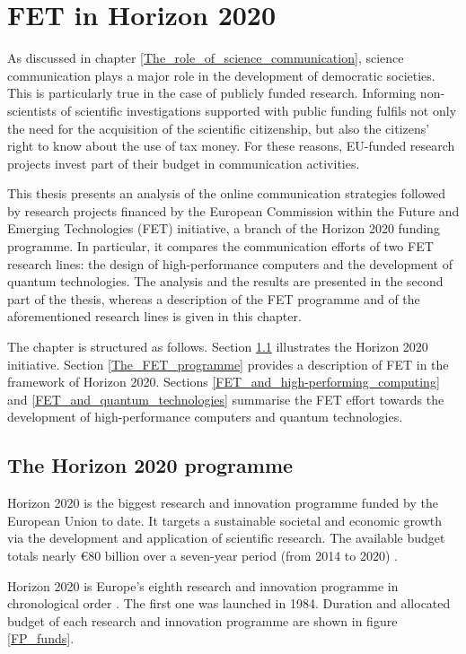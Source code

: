 \chapter{FET in Horizon 2020} \label{FET_in_Horizon_2020}
As discussed in chapter \ref{The_role_of_science_communication}, science communication plays a major role in the development of democratic societies. This is particularly true in the case of publicly funded research. Informing non-scientists of scientific investigations supported with public funding fulfils not only the need for the acquisition of the scientific citizenship, but also the citizens' right to know about the use of tax money. For these reasons, EU-funded research projects invest part of their budget in communication activities. 

This thesis presents an analysis of the online communication strategies followed by research projects financed by the European Commission within the Future and Emerging Technologies (FET) initiative, a branch of the Horizon 2020 funding programme. In particular, it compares the communication efforts of two FET research lines: the design of high-performance computers and the development of quantum technologies. The analysis and the results are presented in the second part of the thesis, whereas a description of the FET programme and of the aforementioned research lines is given in this chapter. 

The chapter is structured as follows. Section \ref{The_Horizon_2020_programme} illustrates the Horizon 2020 initiative. Section \ref{The_FET_programme} provides a description of FET in the framework of Horizon 2020. Sections \ref{FET_and_high-performing_computing} and \ref{FET_and_quantum_technologies} summarise the FET effort towards the development of high-performance computers and quantum technologies.

\section{The Horizon 2020 programme} \label{The_Horizon_2020_programme}
Horizon 2020 is the biggest research and innovation programme funded by the European Union to date. It targets a  sustainable societal and economic growth via the development and application of scientific research. The available budget totals nearly \euro 80 billion over a seven-year period (from 2014 to 2020) \cite{Horizon2020}.

Horizon 2020 is Europe's eighth research and innovation programme in chronological order \cite{FP4,FP5,FP6,FP7}. The first one was launched in 1984. Duration and allocated budget of each research and innovation programme are shown in figure \ref{FP_funds}.


